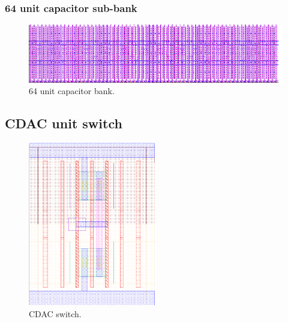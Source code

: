 			\subsubsection{64 unit capacitor sub-bank}
				\begin{figure}[htb!]
				        \centering
				        \includegraphics[width=\textwidth, angle=0]{./figs/layout/layout_cdac_unit_capbank}
				    \caption{64 unit capacitor bank.}
				\end{figure}
			\FloatBarrier
			\subsection{CDAC unit switch}
				\begin{figure}[htb!]
				        \centering
				        \includegraphics[width=0.5\textwidth, angle=0]{./figs/layout/layout_cdac_sw}
				    \caption{CDAC switch.}
				\end{figure}
		\FloatBarrier\pagebreak
